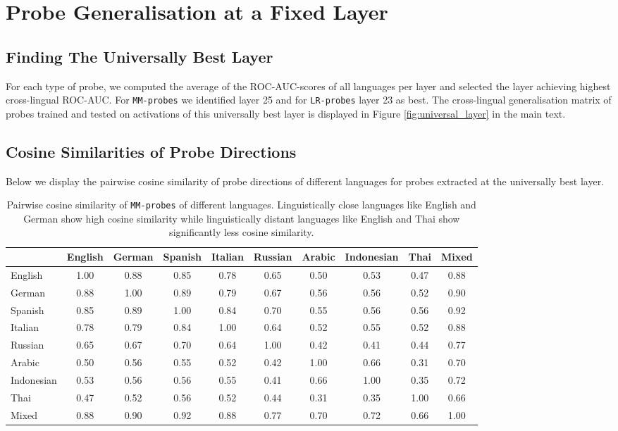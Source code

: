 \section{Probe Generalisation at a Fixed Layer}
\label{app:universal_layer}
\subsection{Finding The Universally Best Layer}
For each type of probe, we computed the average of the ROC-AUC-scores of all languages per layer and selected the layer achieving highest cross-lingual ROC-AUC. For \texttt{MM-probes} we identified layer 25 and for \texttt{LR-probes} layer 23 as best. The cross-lingual generalisation matrix of probes trained and tested on activations of this universally best layer is displayed in Figure \ref{fig:universal_layer} in the main text.

\subsection{Cosine Similarities of Probe Directions}
Below we display the pairwise cosine similarity of probe directions of different languages for probes extracted at the universally best layer.
\begin{table}[h]
\centering
\footnotesize
\setlength{\tabcolsep}{4pt}
\begin{tabular}{lccccccccc}
\toprule
 & English & German & Spanish & Italian & Russian & Arabic & Indonesian & Thai & Mixed \\
\midrule
English & 1.00 & 0.88 & 0.85 & 0.78 & 0.65 & 0.50 & 0.53 & 0.47 & 0.88 \\
German & 0.88 & 1.00 & 0.89 & 0.79 & 0.67 & 0.56 & 0.56 & 0.52 & 0.90 \\
Spanish & 0.85 & 0.89 & 1.00 & 0.84 & 0.70 & 0.55 & 0.56 & 0.56 & 0.92 \\
Italian & 0.78 & 0.79 & 0.84 & 1.00 & 0.64 & 0.52 & 0.55 & 0.52 & 0.88 \\
Russian & 0.65 & 0.67 & 0.70 & 0.64 & 1.00 & 0.42 & 0.41 & 0.44 & 0.77 \\
Arabic & 0.50 & 0.56 & 0.55 & 0.52 & 0.42 & 1.00 & 0.66 & 0.31 & 0.70 \\
Indonesian & 0.53 & 0.56 & 0.56 & 0.55 & 0.41 & 0.66 & 1.00 & 0.35 & 0.72 \\
Thai & 0.47 & 0.52 & 0.56 & 0.52 & 0.44 & 0.31 & 0.35 & 1.00 & 0.66 \\
Mixed & 0.88 & 0.90 & 0.92 & 0.88 & 0.77 & 0.70 & 0.72 & 0.66 & 1.00 \\
\bottomrule
\end{tabular}
\caption{Pairwise cosine similarity of \texttt{MM-probes} of different languages. Linguistically close languages like English and German show high cosine similarity while linguistically distant languages like English and Thai show significantly less cosine similarity.}
\label{tab:mm_cosim}
\end{table}


